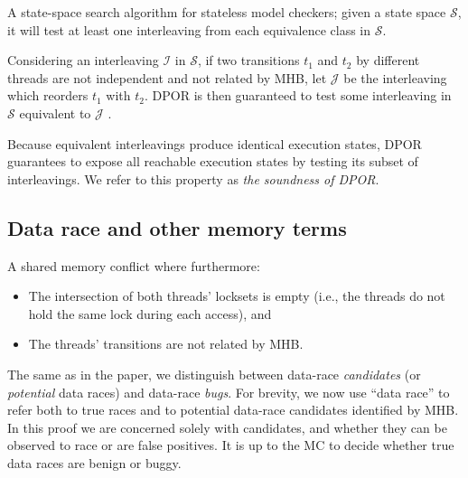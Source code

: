 \begin{definition}
	A state-space search algorithm for stateless model checkers;
	given a state space $\mathcal{S}$, it will test at least one interleaving from each equivalence class in $\mathcal{S}$.
	\label{def:dpor}
\end{definition}

Considering an interleaving $\mathcal{I}$ in $\mathcal{S}$, if two transitions $t_1$ and $t_2$ by different threads are not independent and not related by MHB, let $\mathcal{J}$ be the interleaving which reorders $t_1$ with $t_2$. DPOR is then guaranteed to test some interleaving in $\mathcal{S}$ equivalent to $\mathcal{J}$ \cite{dpor}.

Because equivalent interleavings produce identical execution states,
DPOR guarantees to expose all reachable execution states by testing its subset of interleavings.
We refer to this property as {\em the soundness of DPOR}.


\subsection{Data race and other memory terms}

\begin{definition}
A shared memory conflict where furthermore:
\begin{itemize}
	\item The intersection of both threads' locksets is empty (i.e., the threads do not hold the same lock during each access), and
	\item The threads' transitions are not related by MHB.
\end{itemize}
\end{definition}

The same as in the paper, we distinguish between data-race {\em candidates} (or {\em potential} data races) and data-race {\em bugs}.
For brevity, we now use ``data race'' to refer both to true races and to potential data-race candidates identified by MHB.
In this proof we are concerned solely with candidates, and whether they can be observed to race or are false positives.
It is up to the MC to decide whether true data races are benign or buggy.

